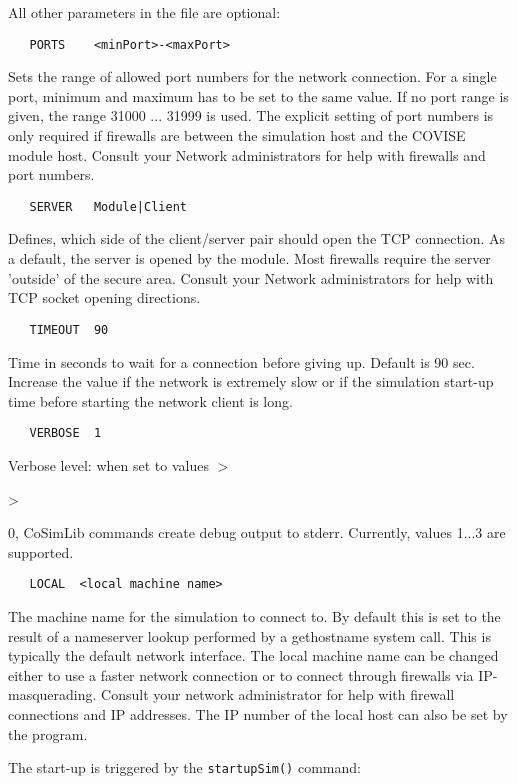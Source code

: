 \begin{htmlonly}
All other parameters in the file are optional:
\begin{verbatim}
   PORTS    <minPort>-<maxPort>
\end{verbatim}
Sets the range of allowed port numbers for the network connection. For a single port, 
minimum and maximum has to be set to the same value. If no port range is given, the range
31000 ... 31999 is used. The explicit setting of port numbers is only required if 
firewalls are between the simulation host and the COVISE module host. Consult your 
Network administrators for help with firewalls and port numbers.
\begin{verbatim}
   SERVER   Module|Client
\end{verbatim}
Defines, which side of the client/server pair should open the TCP connection. As a 
default, the server is opened by the module. Most firewalls require the server 'outside' 
of the secure area. Consult your Network administrators for help with TCP socket 
opening directions.
\begin{verbatim}
   TIMEOUT  90
\end{verbatim}
Time in seconds to wait for a connection before giving up. Default is 90 sec. Increase 
the value if the network is extremely slow or if the simulation start-up time before 
starting the network client is long.
\begin{verbatim}
   VERBOSE  1
\end{verbatim}
Verbose level: when set to values \latexonly $>$ \endlatexonly \begin{htmlonly}
> \end{htmlonly} 0, CoSimLib commands create debug output to stderr. 
Currently, values 1...3 are supported.
\begin{verbatim}
   LOCAL  <local machine name>
\end{verbatim}
The machine name for the simulation to connect to. By default this is set to the result
of a nameserver lookup performed by a gethostname system call. This is typically the 
default network interface. The local machine name can be changed either to use a 
faster network connection or to connect through firewalls via IP-masquerading. Consult 
your network administrator for help with firewall connections and IP addresses. The 
IP number of the local host can also be set by the program. 

The start-up is triggered by the {\tt startupSim()} command:



\end{htmlonly}

